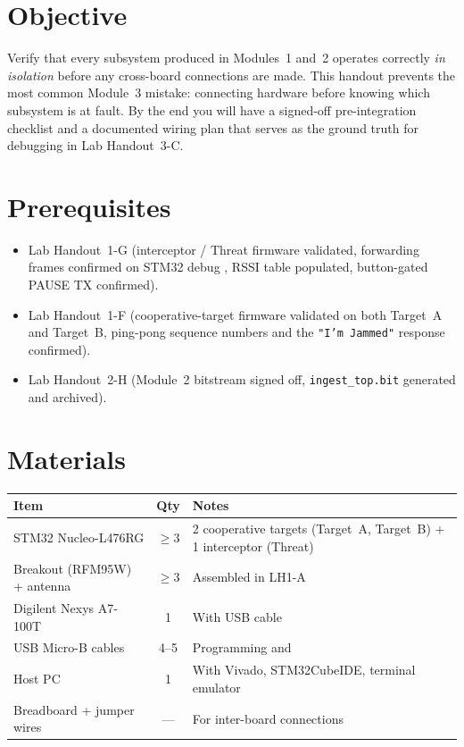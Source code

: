 \documentclass[11pt,letterpaper]{article}
\begin{document}

\section{Objective}
Verify that every subsystem produced in Modules~1 and~2 operates correctly \emph{in isolation} before any cross-board connections are made. This handout prevents the most common Module~3 mistake: connecting hardware before knowing which subsystem is at fault. By the end you will have a signed-off pre-integration checklist and a documented wiring plan that serves as the ground truth for debugging in Lab Handout~3-C.

\section{Prerequisites}
\begin{itemize}[leftmargin=2em]
	\item Lab Handout~1-G (interceptor / Threat firmware validated, forwarding frames confirmed on STM32 debug \UART{}, RSSI table populated, button-gated PAUSE TX confirmed).
	\item Lab Handout~1-F (cooperative-target firmware validated on both Target~A and Target~B, ping-pong sequence numbers and the \texttt{"I'm Jammed"} response confirmed).
	\item Lab Handout~2-H (Module~2 bitstream signed off, \texttt{ingest\_top.bit} generated and archived).
\end{itemize}

\section{Materials}
\begin{table}[h!]
	\centering
	\begin{tabularx}{\textwidth}{l c X}
		\toprule
		\textbf{Item} & \textbf{Qty} & \textbf{Notes} \\
		\midrule
		STM32 Nucleo-L476RG & $\geq 3$ & 2 cooperative targets (Target~A, Target~B) + 1 interceptor (Threat) \\
		\RF{} Breakout (RFM95W) + antenna & $\geq 3$ & Assembled in LH1-A \\
		Digilent Nexys A7-100T & 1 & With USB cable \\
		USB Micro-B cables & 4--5 & Programming and \UART{} \\
		Host PC & 1 & With Vivado, STM32CubeIDE, terminal emulator \\
		Breadboard + jumper wires & --- & For inter-board connections \\
		\bottomrule
	\end{tabularx}
\end{table}
\end{document}
